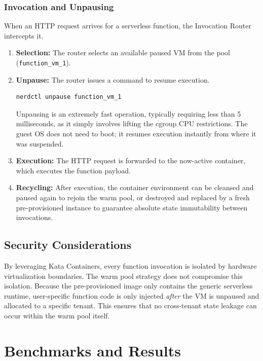 \documentclass[12pt,a4paper]{report}
\begin{document}
\subsection{Invocation and Unpausing}
When an HTTP request arrives for a serverless function, the Invocation Router intercepts it.
\begin{enumerate}
    \item \textbf{Selection:} The router selects an available paused VM from the pool (\texttt{function\_vm\_1}).
    \item \textbf{Unpause:} The router issues a command to resume execution.
    \begin{verbatim}
nerdctl unpause function_vm_1
    \end{verbatim}
    Unpausing is an extremely fast operation, typically requiring less than 5 milliseconds, as it simply involves lifting the cgroup CPU restrictions. The guest OS does not need to boot; it resumes execution instantly from where it was suspended.
    \item \textbf{Execution:} The HTTP request is forwarded to the now-active container, which executes the function payload.
    \item \textbf{Recycling:} After execution, the container environment can be cleansed and paused again to rejoin the warm pool, or destroyed and replaced by a fresh pre-provisioned instance to guarantee absolute state immutability between invocations.
\end{enumerate}

\section{Security Considerations}
By leveraging Kata Containers, every function invocation is isolated by hardware virtualization boundaries. The warm pool strategy does not compromise this isolation. Because the pre-provisioned image only contains the generic serverless runtime, user-specific function code is only injected \textit{after} the VM is unpaused and allocated to a specific tenant. This ensures that no cross-tenant state leakage can occur within the warm pool itself.

\vspace{2cm}
\lipsum[41-60]

\clearpage{}
\clearpage{}\chapter{Benchmarks and Results}
\end{document}
